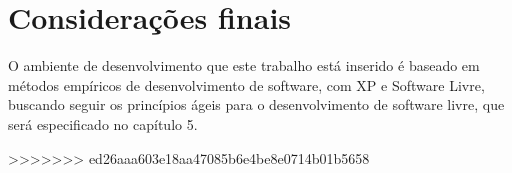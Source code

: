 
\section{Considerações finais}
O ambiente de desenvolvimento que este trabalho está inserido é baseado em métodos empíricos de desenvolvimento de software, com XP e Software Livre, buscando seguir os princípios ágeis para o desenvolvimento de software livre, que será especificado no capítulo 5.

>>>>>>> ed26aaa603e18aa47085b6e4be8e0714b01b5658
